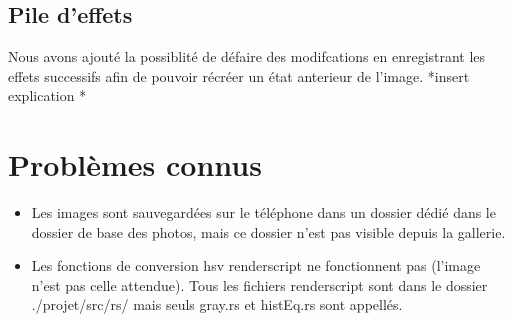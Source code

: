 \documentclass[12pt]{article}
\begin{document}
\subsection{Pile d'effets}

Nous avons ajouté la possiblité de défaire des modifcations en enregistrant les effets successifs afin de pouvoir récréer un état anterieur de l'image.
*insert explication *


\section{Problèmes connus}

\begin{itemize}
    \item Les images sont sauvegardées sur le téléphone dans un dossier dédié dans le dossier de base des photos, mais ce dossier n'est pas visible depuis la gallerie.\\
    \item Les fonctions de conversion hsv renderscript ne fonctionnent pas (l'image n'est pas celle attendue). Tous les fichiers renderscript sont dans le dossier ./projet/src/rs/ mais seuls gray.rs et histEq.rs sont appellés.\\
\end{itemize}
\end{document}
